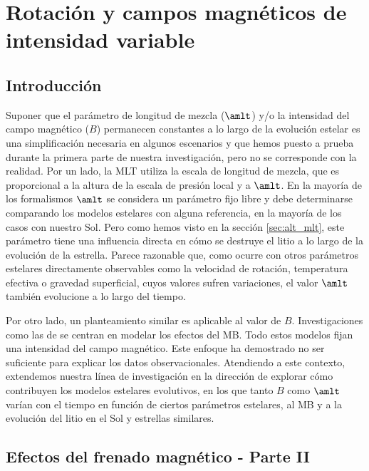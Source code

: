 
\chapter{Rotación y campos magnéticos de intensidad variable}\label{ch:sexto-capitulo}

\section{Introducción}
Suponer que el parámetro de longitud de mezcla ($\amlt$) y/o la intensidad del campo magnético ($B$) permanecen constantes a lo largo de la evolución estelar es una simplificación necesaria en algunos escenarios y que hemos puesto a prueba durante la primera parte de nuestra investigación, pero no se corresponde con la realidad. Por un lado,  la MLT utiliza la escala de longitud de mezcla, que es proporcional a la altura de la escala de presión local y a $\amlt$. En la mayoría de los formalismos $\amlt$ se considera un parámetro fijo libre y debe determinarse comparando los modelos estelares con alguna referencia, en la mayoría de los casos con nuestro Sol. Pero como hemos visto en la sección \ref{sec:alt_mlt}, este parámetro tiene una influencia directa en cómo se destruye el litio a lo largo de la evolución de la estrella. Parece razonable que, como ocurre con otros parámetros estelares directamente observables como la velocidad de rotación, temperatura efectiva o gravedad superficial, cuyos valores sufren variaciones, el valor $\amlt$ también evolucione a lo largo del tiempo.\par

Por otro lado, un planteamiento similar es aplicable al valor de $B$. Investigaciones como las de \citet{Ud-Doula2008, Cranmer2011, Gallet2015, Amard2016} se centran en modelar los efectos del MB. Todo estos modelos fijan una intensidad del campo magnético. Este enfoque ha demostrado no ser suficiente para explicar los datos observacionales. Atendiendo a este contexto, extendemos nuestra línea de investigación en la dirección de explorar cómo contribuyen los modelos estelares evolutivos, en los que tanto $B$ como $\amlt$ varían con el tiempo en función de ciertos parámetros estelares, al MB y a la evolución del litio en el Sol y estrellas similares.\par


\section{Efectos del frenado magnético - Parte II}

